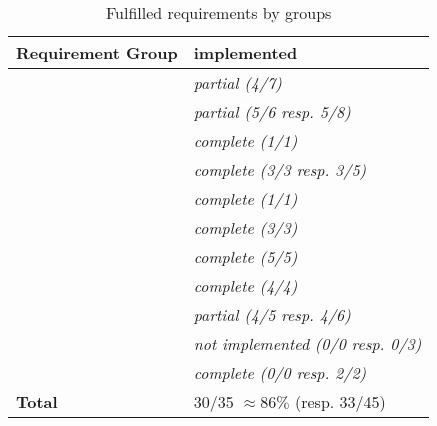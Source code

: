 \begin{table}[H]
    \begin{tabu}{X l}
        \toprule
        Requirement Group
        & implemented\\
        \midrule

        & \textit{partial (4/7)} \\

        & \textit{partial (5/6 resp. 5/8)}\\

        & \textit{complete (1/1)}\\

        & \textit{complete (3/3 resp. 3/5)}\\

        & \textit{complete (1/1)}\\

        & \textit{complete (3/3)}\\

        & \textit{complete (5/5)}\\

        & \textit{complete (4/4)}\\

        & \textit{partial (4/5 resp. 4/6)}\\

        & \textit{not implemented (0/0 resp. 0/3)}\\

        & \textit{complete (0/0 resp. 2/2)}\\

        \textbf{Total}
        & 30/35 $\approx 86\%$ (resp. 33/45) \\

    \end{tabu}
    \caption{Fulfilled requirements by groups}
    \label{tab:implemented-requirements}
\end{table}


